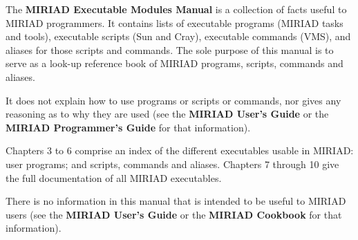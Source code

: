 

The {\bf MIRIAD Executable Modules Manual} is a collection of facts
useful to MIRIAD programmers. It contains lists of executable
programs (MIRIAD tasks and tools), executable scripts (Sun and
Cray), executable commands (VMS), and aliases for those scripts and
commands. The sole purpose of this manual is to serve as a look-up
reference book of MIRIAD programs, scripts, commands and aliases.

\vskip 0.5in
\par It does not explain how to use programs or scripts or commands,
 nor gives any reasoning as to why they are used (see the {\bf MIRIAD
 User's Guide} or the {\bf MIRIAD Programmer's Guide} for that information).
\vskip 0.5in
\par Chapters 3 to 6 comprise an index of the different executables
usable in MIRIAD: user programs; and scripts, commands and aliases.
Chapters 7 through 10 give the full documentation of all MIRIAD
executables.

\vskip 0.5in
\par There is no information in this manual that is intended to be useful
to MIRIAD users (see the {\bf MIRIAD User's Guide} or the {\bf MIRIAD
Cookbook} for that information).

\endchapter

